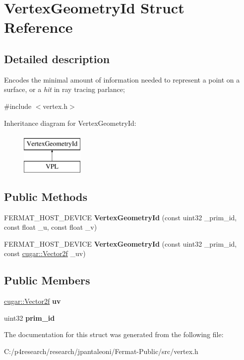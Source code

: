 \hypertarget{struct_vertex_geometry_id}{}\section{Vertex\+Geometry\+Id Struct Reference}
\label{struct_vertex_geometry_id}


\subsection{Detailed description}
Encodes the minimal amount of information needed to represent a point on a surface, or a {\itshape hit} in ray tracing parlance; 

{\ttfamily \#include $<$vertex.\+h$>$}

Inheritance diagram for Vertex\+Geometry\+Id\+:\begin{figure}[H]
\begin{center}
\leavevmode
\includegraphics[height=2.000000cm]{struct_vertex_geometry_id}
\end{center}
\end{figure}
\subsection*{Public Methods}
\begin{DoxyCompactItemize}
\item 
\mbox{\label{struct_vertex_geometry_id_af5fc4324108871c918fb801923c013f6}} 
F\+E\+R\+M\+A\+T\+\_\+\+H\+O\+S\+T\+\_\+\+D\+E\+V\+I\+CE {\bfseries Vertex\+Geometry\+Id} (const uint32 \+\_\+prim\+\_\+id, const float \+\_\+u, const float \+\_\+v)
\item 
\mbox{\label{struct_vertex_geometry_id_aa40ebb5a3948b591fb7ffd3cb671afdb}} 
F\+E\+R\+M\+A\+T\+\_\+\+H\+O\+S\+T\+\_\+\+D\+E\+V\+I\+CE {\bfseries Vertex\+Geometry\+Id} (const uint32 \+\_\+prim\+\_\+id, const \hyperlink{structcugar_1_1_vector}{cugar\+::\+Vector2f} \+\_\+uv)
\end{DoxyCompactItemize}
\subsection*{Public Members}
\begin{DoxyCompactItemize}
\item 
\mbox{\label{struct_vertex_geometry_id_a44b8de8188f80bad96c5bada364f32dd}} 
\hyperlink{structcugar_1_1_vector}{cugar\+::\+Vector2f} {\bfseries uv}
\item 
\mbox{\label{struct_vertex_geometry_id_a47e9b11f380904465da1a8ae94c464c4}} 
uint32 {\bfseries prim\+\_\+id}
\end{DoxyCompactItemize}


The documentation for this struct was generated from the following file\+:\begin{DoxyCompactItemize}
\item 
C\+:/p4research/research/jpantaleoni/\+Fermat-\/\+Public/src/vertex.\+h\end{DoxyCompactItemize}
